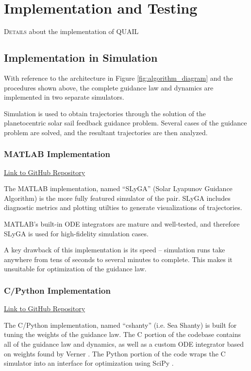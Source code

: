 \chapter{Implementation and Testing}

\lettrine{D}{etails} about the implementation of QUAIL

\section{Implementation in Simulation}
With reference to the architecture in Figure \ref{fig:algorithm_diagram} and the procedures shown above, the complete guidance law and dynamics are implemented in two separate simulators.

Simulation is used to obtain trajectories through the solution of the planetocentric solar sail feedback guidance problem. Several cases of the guidance problem are solved, and the resultant trajectories are then analyzed.

\subsection{MATLAB Implementation}
\href{https://github.com/itchono/SLyGA}{Link to GitHub Repository}

The MATLAB implementation, named ``SLyGA'' (Solar Lyapunov Guidance Algorithm) is the more fully featured simulator of the pair. SLyGA includes diagnostic metrics and plotting utilties to generate visualizations of trajectories.

MATLAB's built-in ODE integrators are mature and well-tested, and therefore SLyGA is used for high-fidelity simulation cases.

A key drawback of this implementation is its speed -- simulation runs take anywhere from tens of seconds to several minutes to complete. This makes it unsuitable for optimization of the guidance law.

\subsection{C/Python Implementation}
\href{https://github.com/itchono/cshanty}{Link to GitHub Repository}

The C/Python implementation, named ``cshanty'' (i.e. Sea Shanty) is built for tuning the weights of the guidance law. The C portion of the codebase contains all of the guidance law and dynamics, as well as a custom ODE integrator based on weights found by Verner \cite{verner2010numerically}. The Python portion of the code wraps the C simulator into an interface for optimization using SciPy \cite{2020SciPy-NMeth}.

